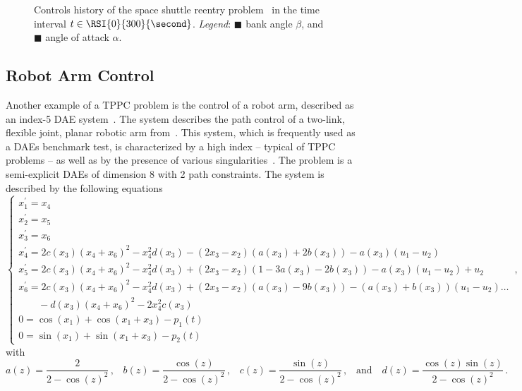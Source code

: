 \begin{figure}[htb]
  \centering
  \small{}
  \caption{Controls history of the space shuttle reentry problem~\cite{brenan1995numerical} in the time interval $t \in \RSI{0}{300}{\second}$. \emph{Legend}: \textcolor{mycolor1}{$\blacksquare$} bank angle $\beta$, and \textcolor{mycolor2}{$\blacksquare$} angle of attack $\alpha$.}
  \label{chap5:fig:tppc_final}
\end{figure}

\subsection{Robot Arm Control}

Another example of a \ac{TPPC} problem is the control of a robot arm, described as an index-5 \ac{DAE} system~\cite{pryce1998solving}. The system describes the path control of a two-link, flexible joint, planar robotic arm from~\cite{campbell1988general}. This system, which is frequently used as a \acp{DAE} benchmark test, is characterized by a high index -- typical of \ac{TPPC} problems -- as well as by the presence of various singularities~\cite{schwarz2020singularities}. The problem is a semi-explicit \acp{DAE} of dimension 8 with 2 path constraints. The system is described by the following equations
%
\begin{equation}
  \begin{cases}
    x_1^{\prime} = x_4 \\
    x_2^{\prime} = x_5 \\
    x_3^{\prime} = x_6 \\
    x_4^{\prime} = 2c(x_3)(x_4+x_6)^2 - x_4^2d(x_3) - (2x_3-x_2)(a(x_3)+2b(x_3)) - a(x_3)(u_1-u_2) \\
    x_5^{\prime} = 2c(x_3)(x_4+x_6)^2 - x_4^2d(x_3) + (2 x_3-x_2)(1-3a(x_3)-2b(x_3)) - a(x_3)(u_1-u_2) + u_2 \\
    x_6^{\prime} = 2c(x_3)(x_4+x_6)^2 - x_4^2d(x_3) + (2 x_3-x_2)(a(x_3)-9b(x_3)) - (a(x_3)+b(x_3))(u_1-u_2) \dots \\
    \qquad - d(x_3)(x_4+x_6)^2 - 2x_4^2c(x_3) \\
    0 = \cos(x_1) + \cos(x_1+x_3) - p_1(t) \\
    0 = \sin(x_1) + \sin(x_1+x_3) - p_2(t)
  \end{cases} \, \text{,}
\end{equation}
%
with
%
\begin{equation}
  a(z) = \dfrac{2}{2-\cos(z)^2} \, \text{,}
  \quad
  b(z) = \dfrac{\cos(z)}{2-\cos(z)^2} \, \text{,}
  \quad
  c(z) = \dfrac{\sin(z)}{2-\cos(z)^2} \, \text{,}
  \quad \text{and} \quad
  d(z) = \dfrac{\cos(z)\sin(z)}{2-\cos(z)^2} \, \text{.}
\end{equation}
